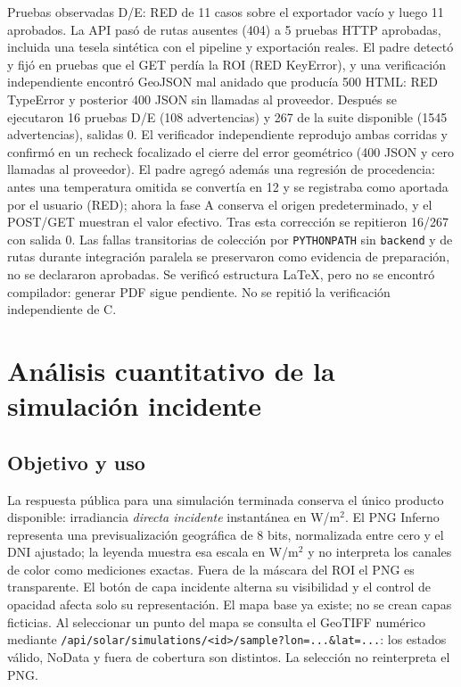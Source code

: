 \documentclass[11pt,a4paper]{article}
\begin{document}
Pruebas observadas D/E: RED de 11 casos sobre el exportador vacío y luego 11 aprobados. La API pasó de rutas ausentes (404) a 5 pruebas HTTP aprobadas, incluida una tesela sintética con el pipeline y exportación reales. El padre detectó y fijó en pruebas que el GET perdía la ROI (RED KeyError), y una verificación independiente encontró GeoJSON mal anidado que producía 500 HTML: RED TypeError y posterior 400 JSON sin llamadas al proveedor. Después se ejecutaron 16 pruebas D/E (108 advertencias) y 267 de la suite disponible (1545 advertencias), salidas 0. El verificador independiente reprodujo ambas corridas y confirmó en un recheck focalizado el cierre del error geométrico (400 JSON y cero llamadas al proveedor). El padre agregó además una regresión de procedencia: antes una temperatura omitida se convertía en 12 y se registraba como aportada por el usuario (RED); ahora la fase A conserva el origen predeterminado, y el POST/GET muestran el valor efectivo. Tras esta corrección se repitieron 16/267 con salida 0. Las fallas transitorias de colección por \texttt{PYTHONPATH} sin \texttt{backend} y de rutas durante integración paralela se preservaron como evidencia de preparación, no se declararon aprobadas. Se verificó estructura LaTeX, pero no se encontró compilador: generar PDF sigue pendiente. No se repitió la verificación independiente de C.

\section{Análisis cuantitativo de la simulación incidente}
\subsection{Objetivo y uso}
La respuesta pública para una simulación terminada conserva el único producto disponible: irradiancia \emph{directa incidente} instantánea en W/m$^2$. El PNG Inferno representa una previsualización geográfica de 8 bits, normalizada entre cero y el DNI ajustado; la leyenda muestra esa escala en W/m$^2$ y no interpreta los canales de color como mediciones exactas. Fuera de la máscara del ROI el PNG es transparente. El botón de capa incidente alterna su visibilidad y el control de opacidad afecta solo su representación. El mapa base ya existe; no se crean capas ficticias. Al seleccionar un punto del mapa se consulta el GeoTIFF numérico mediante \texttt{/api/solar/simulations/<id>/sample?lon=...\&lat=...}: los estados válido, NoData y fuera de cobertura son distintos. La selección no reinterpreta el PNG.
\end{document}
